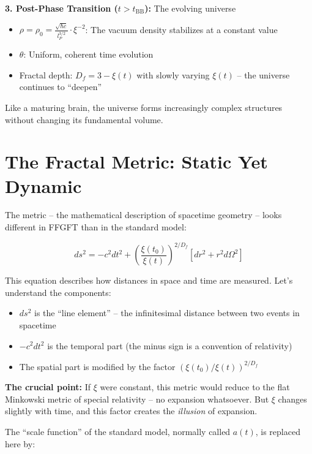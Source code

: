 \documentclass[12pt,a4paper]{article}
\begin{document}
\textbf{3. Post-Phase Transition ($t > t_{\text{BB}}$):} The evolving universe

\begin{itemize}[leftmargin=*]
\item $\rho = \rho_0 = \frac{\sqrt{\hbar c}}{l_P^{3/2}} \cdot \xi^{-2}$: The vacuum density stabilizes at a constant value
\item $\theta$: Uniform, coherent time evolution
\item Fractal depth: $D_f = 3 - \xi(t)$ with slowly varying $\xi(t)$ -- the universe continues to ``deepen''
\end{itemize}

Like a maturing brain, the universe forms increasingly complex structures without changing its fundamental volume.

\section{The Fractal Metric: Static Yet Dynamic}

The metric -- the mathematical description of spacetime geometry -- looks different in FFGFT than in the standard model:

\begin{equation}
ds^2 = -c^2 dt^2 + \left(\frac{\xi(t_0)}{\xi(t)}\right)^{2/D_f} \left[dr^2 + r^2 d\Omega^2\right]
\end{equation}

This equation describes how distances in space and time are measured. Let's understand the components:

\begin{itemize}[leftmargin=*]
\item $ds^2$ is the ``line element'' -- the infinitesimal distance between two events in spacetime
\item $-c^2 dt^2$ is the temporal part (the minus sign is a convention of relativity)
\item The spatial part is modified by the factor $(\xi(t_0)/\xi(t))^{2/D_f}$
\end{itemize}

\textbf{The crucial point:} If $\xi$ were constant, this metric would reduce to the flat Minkowski metric of special relativity -- no expansion whatsoever. But $\xi$ changes slightly with time, and this factor creates the \textit{illusion} of expansion.

The ``scale function'' of the standard model, normally called $a(t)$, is replaced here by:
\end{document}
